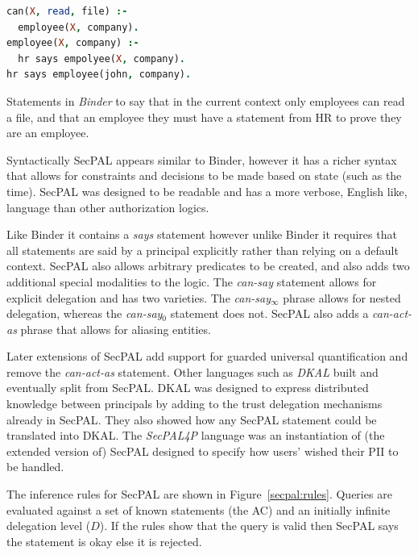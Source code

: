 \documentclass[a4paper,12pt,sfsidenotes]{tufte-book}
\begin{document}
\begin{marginfigure}\label{code:binder}
  \begin{lstlisting}[language=Prolog,morekeywords={*,says,:-}]
can(X, read, file) :- 
  employee(X, company).
employee(X, company) :- 
  hr says empolyee(X, company).
hr says employee(john, company).
  \end{lstlisting}
  \caption{Statements in \emph{Binder} to say that in the current context only
    employees can read a file, and that an employee they must have a statement
    from HR to prove they are an employee.}
\end{marginfigure}

Syntactically {SecPAL} appears similar to Binder, however it has a richer syntax
that allows for constraints and decisions to be made based on state (such as the
time). {SecPAL} was designed to be readable and has a more verbose, English like,
language than other authorization logics.

Like Binder it contains a \emph{says} statement however unlike Binder it
requires that all statements are said by a principal explicitly rather than
relying on a default context. {SecPAL} also allows arbitrary predicates to be
created, and also adds two additional special modalities to the logic. The
\emph{can-say} statement allows for explicit delegation and has two varieties.
The \emph{can-say$_\infty$} phrase allows for nested delegation, whereas the
\emph{can-say$_0$} statement does not. {SecPAL} also adds a \emph{can-act-as}
phrase that allows for aliasing entities.

Later extensions of {SecPAL}\cite{Becker:2009vt} add support for guarded
universal quantification and remove the \emph{can-act-as} statement. Other
languages such as \emph{DKAL}\cite{Gurevich:2008fz} built and eventually split
from {SecPAL}. DKAL was designed to express distributed knowledge between
principals by adding to the trust delegation mechanisms already in {SecPAL}.
They also showed how any {SecPAL} statement could be translated into {DKAL}.
The \emph{{SecPAL}4P} language\cite{Becker:2009ula} was an instantiation of (the
extended version of) {SecPAL} designed to specify how users' wished their
\ac{PII} to be handled.

The inference rules for SecPAL are shown in Figure~\ref{secpal:rules}. Queries
are evaluated against a set of known statements (the \ac{AC}) and an initially
infinite delegation level ($D$). If the rules show that the query is valid then
SecPAL says the statement is okay else it is rejected.
\end{document}
